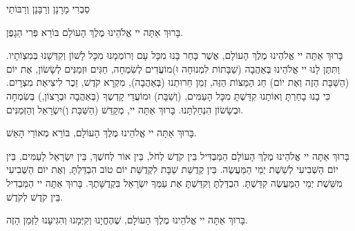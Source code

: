 

\begin{framed}

\end{framed}

סַבְרִי מָרָנָן וְרַבָּנָן וְרַבּוֹתַי

בָּרוּךְ אַתָּה יי אֱלֹהֵינוּ מֶלֶךְ הָעוֹלָם בּוֹרֵא פְּרִי הַגָפֶן.


בָּרוּךְ אַתָּה יי אֱלֹהֵינוּ מֶלֶךְ הָעוֹלָם, אֲשֶׁר בָּחַר בָּנוּ מִכָּל עָם וְרוֹמְמָנוּ מִכָּל לָשׁוֹן וְקִדְּשָׁנוּ בְּמִצְוֹתָיו. וַתִּתֶּן לָנוּ יי אֱלֹהֵינוּ בְּאַהֲבָה (שַׁבָּתוֹת לִמְנוּחָה וּ)מוֹעֲדִים לְשִׂמְחָה, חַגִּים וּזְמַנִּים לְשָׂשׂוֹן, אֶת יוֹם (הַשַּׁבָּת הַזֶה וְאֶת יוֹם) חַג הַמַּצּוֹת הַזֶּה, זְמַן חֵרוּתֵנוּ (בְּאַהֲבָה), מִקְרָא קֹדֶשׁ, זֵכֶר לִיצִיאַת מִצְרָיִם. כִּי בָנוּ בָחַרְתָּ וְאוֹתָנוּ קִדַּשְׁתָּ מִכָּל הָעַמִּים, (וְשַׁבָּת) וּמוֹעֲדֵי קָדְשֶךָ (בְּאַהֲבָה וּבְרָצוֹן,) בְּשִׂמְחָה וּבְשָׂשׂוֹן הִנְחַלְתָּנוּ. בָּרוּךְ אַתָּה יי, מְקַדֵּשׁ (הַשַּׁבָּת וְ)יִשְׂרָאֵל וְהַזְּמַנִּים.

\begin{framed}

בָּרוּךְ אַתָּה יי אֱלֹהֵינוּ מֶלֶךְ הָעוֹלָם, בּוֹרֵא מְאוֹרֵי הָאֵשׁ.

בָּרוּךְ אַתָּה יי אֱלֹהֵינוּ מֶלֶךְ הָעוֹלָם הַמַּבְדִּיל בֵּין קֹדֶשׁ לְחֹל, בֵּין אוֹר לְחשֶׁךְ, בֵּין יִשְׂרָאֵל לָעַמִּים, בֵּין יוֹם הַשְּׁבִיעִי לְשֵׁשֶׁת יְמֵי הַמַּעֲשֶׂה. בֵּין קְדֻשַּׁת שַׁבָּת לִקְדֻשַּׁת יוֹם טוֹב הִבְדַּלְתָּ, וְאֶת יוֹם הַשְּׁבִיעִי מִשֵּׁשֶׁת יְמֵי הַמַּעֲשֶׂה קִדַּשְׁתָּ. הִבְדַּלְתָּ וְקִדַּשְׁתָּ אֶת עַמְּךָ יִשְׂרָאֵל בִּקְדֻשָּׁתֶךָ. בָּרוּךְ אַתָּה יי הַמַּבְדִיל בֵּין קֹדֶשׁ לְקֹדֶשׁ.
\end{framed}

בָּרוּךְ אַתָּה יי אֱלֹהֵינוּ מֶלֶךְ הָעוֹלָם, שֶׁהֶחֱיָנוּ וְקִיְּמָנוּ וְהִגִּיעָנוּ לַזְּמַן הַזֶה.

